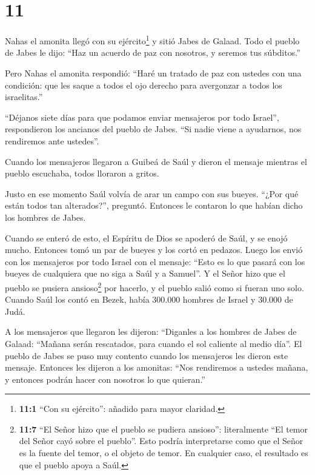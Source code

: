 \hypertarget{section-10}{%
\section{11}\label{section-10}}

 Nahas el amonita llegó con su ejército\footnote{\textbf{11:1}
  ``Con su ejército'': añadido para mayor claridad.} y sitió Jabes de
Galaad. Todo el pueblo de Jabes le dijo: ``Haz un acuerdo de paz con
nosotros, y seremos tus súbditos.''

 Pero Nahas el amonita respondió: ``Haré un tratado de paz
con ustedes con una condición: que les saque a todos el ojo derecho para
avergonzar a todos los israelitas.''

 ``Déjanos siete días para que podamos enviar mensajeros por
todo Israel'', respondieron los ancianos del pueblo de Jabes. ``Si nadie
viene a ayudarnos, nos rendiremos ante ustedes''.

 Cuando los mensajeros llegaron a Guibeá de Saúl y dieron el
mensaje mientras el pueblo escuchaba, todos lloraron a gritos.

 Justo en ese momento Saúl volvía de arar un campo con sus
bueyes. ``¿Por qué están todos tan alterados?'', preguntó. Entonces le
contaron lo que habían dicho los hombres de Jabes.

 Cuando se enteró de esto, el Espíritu de Dios se apoderó de
Saúl, y se enojó mucho.  Entonces tomó un par de bueyes y
los cortó en pedazos. Luego los envió con los mensajeros por todo Israel
con el mensaje: ``Esto es lo que pasará con los bueyes de cualquiera que
no siga a Saúl y a Samuel''. Y el Señor hizo que el pueblo se pusiera
ansioso\footnote{\textbf{11:7} ``El Señor hizo que el pueblo se pudiera
  ansioso'': literalmente ``El temor del Señor cayó sobre el pueblo''.
  Esto podría interpretarse como que el Señor es la fuente del temor, o
  el objeto de temor. En cualquier caso, el resultado es que el pueblo
  apoya a Saúl.} por hacerlo, y el pueblo salió como si fueran uno solo.
 Cuando Saúl los contó en Bezek, había 300.000 hombres de
Israel y 30.000 de Judá.

 A los mensajeros que llegaron les dijeron: ``Diganles a los
hombres de Jabes de Galaad: ``Mañana serán rescatados, para cuando el
sol caliente al medio día''. El pueblo de Jabes se puso muy contento
cuando los mensajeros les dieron este mensaje.  Entonces
les dijeron a los amonitas: ``Nos rendiremos a ustedes mañana, y
entonces podrán hacer con nosotros lo que quieran.''

